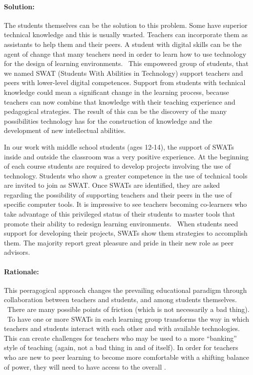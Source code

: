 \paragraph{Solution:}
The students themselves can be the solution to this problem. Some have
superior technical knowledge and this is usually wasted. Teachers can
incorporate them as assistants to help them and their peers. A student
with digital skills can be the agent of change that many teachers need
in order to learn how to use technology for the design of learning
environments. ~This empowered group of students, that we named SWAT
(Students With Abilities in Technology) support teachers and peers with
lower-level digital competences. Support from students with technical
knowledge could mean a significant change in the learning process,
because teachers can now combine that knowledge with their teaching
experience and pedagogical strategies. The result of this can be the
discovery of the many possibilities technology has for the construction
of knowledge and the development of new intellectual abilities.

In our work with middle school students (ages 12-14), the support of
SWATs inside and outside the classroom was a very positive experience.
At the beginning of each course students are required to develop
projects involving the use of technology. Students who show a greater
competence in the use of technical tools are invited to join as SWAT.
Once SWATs are identified, they are asked regarding the possibility of
supporting teachers and their peers in the use of specific computer
tools. It is impressive to see teachers becoming co-learners who take
advantage of this privileged status of their students to master tools
that promote their ability to redesign learning environments. ~When
students need support for developing their projects, SWATs show them
strategies to accomplish them. The majority report great pleasure and
pride in their new role as peer advisors.

\paragraph{Rationale:}

This peeragogical approach changes the prevailing educational paradigm
through collaboration between teachers and students, and among
students themselves. ~There are many possible points of friction
(which is not necessarily a bad thing). ~To have one or more SWATs in
each learning group transforms the way in which teachers and students
interact with each other and with available technologies.  This can
create challenges for teachers who may be used to a more ``banking''
style of teaching (again, not a bad thing in and of itself).  In
order for teachers who are new to peer learning to become more
comfortable with a shifting balance of power, they will need to have
access to the overall .

